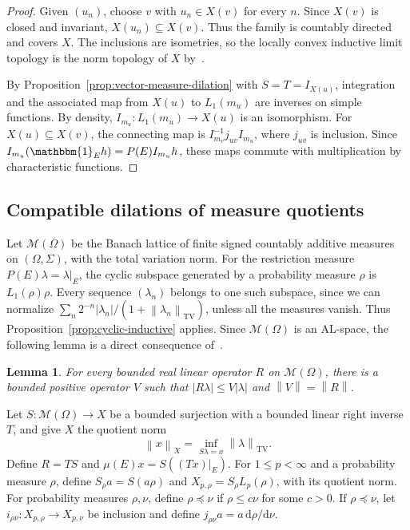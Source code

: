 \documentclass[11pt,leqno]{amsart}
\theoremstyle{compact}
\numberwithin{equation}{section}
\newtheorem{lemma}[theorem]{Lemma}
\theoremstyle{compactremark}
\theoremstyle{compact}
\newcommand{\1}{\mathbbm{1}}
\newcommand{\rmd}{\mathrm{d}}
\newcommand{\norm}[1]{\left\|#1\right\|}
\newcommand{\abs}[1]{\left|#1\right|}
\begin{document}
\begin{proof}
Given $(u_n)$, choose $v$ with $u_n\in X(v)$ for every $n$. Since $X(v)$ is closed and invariant, $X(u_n)\subseteq X(v)$. Thus the family is countably directed and covers $X$. The inclusions are isometries, so the locally convex inductive limit topology is the norm topology of $X$ by~\cite[Theorems~1 and~2]{Pym1968}.

By Proposition~\ref{prop:vector-measure-dilation} with $S=T=I_{X(u)}$, integration and the associated map from $X(u)$ to $L_1(m_u)$ are inverses on simple functions. By density, $I_{m_u}\colon L_1(m_u)\to X(u)$ is an isomorphism. For $X(u)\subseteq X(v)$, the connecting map is $I_{m_v}^{-1}j_{uv}I_{m_u}$, where $j_{uv}$ is inclusion. Since $I_{m_u}(\1_Eh)=P(E)I_{m_u}h$, these maps commute with multiplication by characteristic functions.
\end{proof}

\subsection[Compatible dilations of measure quotients]{Compatible dilations of measure quotients}

Let $\mathcal M(\Omega)$ be the Banach lattice of finite signed countably additive measures on $(\Omega,\Sigma)$, with the total variation norm. For the restriction measure $P(E)\lambda=\lambda|_E$, the cyclic subspace generated by a probability measure $\rho$ is $L_1(\rho)\rho$. Every sequence $(\lambda_n)$ belongs to one such subspace, since we can normalize $\sum_n2^{-n}\abs{\lambda_n}/(1+\norm{\lambda_n}_{\mathrm{TV}})$, unless all the measures vanish. Thus Proposition~\ref{prop:cyclic-inductive} applies. Since $\mathcal M(\Omega)$ is an AL-space, the following lemma is a direct consequence of~\cite[p.~82]{DalesLaustsenOikhbergTroitsky2017}.

\begin{lemma}\label{lem:measure-positive-majorant}
For every bounded real linear operator $R$ on $\mathcal M(\Omega)$, there is a bounded positive operator $V$ such that $ \abs{R\lambda}\leq V\abs{\lambda} $ and $\norm{V}=\norm{R}$.
\end{lemma}

\begingroup
Let $S\colon\mathcal M(\Omega)\to X$ be a bounded surjection with a bounded linear right inverse $T$, and give $X$ the quotient norm
\[
\norm{x}_X=\inf_{S\lambda=x}\norm{\lambda}_{\mathrm{TV}}.
\]
Define $R=TS$ and $\mu(E)x=S((Tx)|_E)$. For $1\leq p<\infty$ and a probability measure $\rho$, define $S_\rho a=S(a\rho)$ and $X_{p,\rho}=S_\rho L_p(\rho)$, with its quotient norm. For probability measures $\rho,\nu$, define $\rho\preceq\nu$ if $\rho\leq c\nu$ for some $c>0$. If $\rho\preceq\nu$, let $i_{\rho\nu}\colon X_{p,\rho}\to X_{p,\nu}$ be inclusion and define $j_{\rho\nu}a=a\,\rmd\rho/\rmd\nu$.
\end{document}
